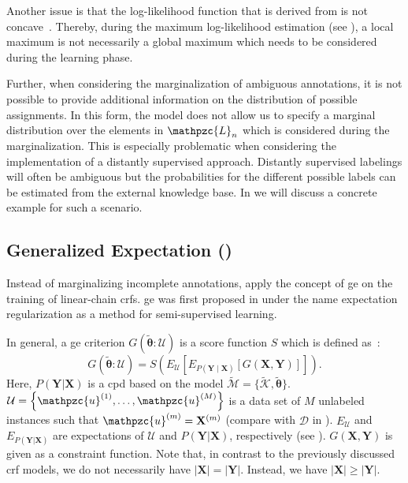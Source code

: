 Another issue is that the log-likelihood function that is derived from  is not concave~\citep{tsuboi2008training}.
Thereby, during the maximum log-likelihood estimation (see ), a local maximum is not necessarily a global maximum which needs to be considered during the learning phase.

Further, when considering the marginalization of ambiguous annotations, it is not possible to provide additional information on the distribution of possible assignments.
In this form, the model does not allow us to specify a \gls{marginal distribution} over the elements in $\mathpzc{L}_n$ which is considered during the marginalization.
This is especially problematic when considering the implementation of a distantly supervised approach.
Distantly supervised labelings will often be ambiguous but the probabilities for the different possible labels can be estimated from the external knowledge base.
In  we will discuss a concrete example for such a scenario.

\subsection{Generalized Expectation ()}

Instead of marginalizing incomplete annotations, \citet{mann2008generalized} apply the concept of \acrfull{ge} on the training of linear-chain \glspl{crf}.
\Gls{ge} was first proposed in \citet{mann2007simple} under the name \gls{expectation regularization} as a method for semi-supervised learning.

In general, a \gls{ge} criterion $G(\bm{\tilde{\theta}}:\mathcal{U})$ is a score function $S$ which is defined as~\citep{mann2010generalized}:
\begin{equation}
  \label{equ:generalized-expectation}
  G(\bm{\tilde{\theta}}:\mathcal{U})=S\left(E_{\mathcal{U}}\left[E_{P(\mathbf{Y}\mid\mathbf{X})}\left[G(\mathbf{X},\mathbf{Y})\right]\right]\right).
\end{equation}
Here, $P(\mathbf{Y}|\mathbf{X})$ is a \gls{cpd} based on the model $\tilde{\mathcal{M}}=\{\tilde{\mathcal{K}},\bm{\tilde{\theta}}\}$.
$\mathcal{U}=\left\{\mathpzc{u}^{(1)},\dots,\mathpzc{u}^{(M)}\right\}$ is a data set of $M$ unlabeled instances such that $\mathpzc{u}^{(m)}=\mathbf{X}^{(m)}$ (compare with $\mathcal{D}$ in ).
$E_{\mathcal{U}}$ and $E_{P(\mathbf{Y}|\mathbf{X})}$ are expectations of $\mathcal{U}$ and $P(\mathbf{Y}|\mathbf{X})$, respectively (see ).
$G(\mathbf{X},\mathbf{Y})$ is given as a constraint function.
Note that, in contrast to the previously discussed \gls{crf} models, we do not necessarily have $|\mathbf{X}|=|\mathbf{Y}|$.
Instead, we have $|\mathbf{X}|\geq|\mathbf{Y}|$.

